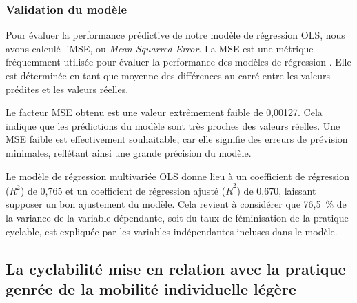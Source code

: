 \begin{refsegment}
\subsubsection*{Validation du modèle
    \label{chap4:methodologie-validation}
    }

Pour évaluer la performance prédictive de notre modèle de régression \acrshort{OLS}, nous avons calculé l'\acrfull{MSE}, ou \textsl{Mean Squarred Error}. La \acrshort{MSE} est une \gls{métrique} fréquemment utilisée pour évaluer la performance des modèles de régression \textcolor{blue}{\autocite{cochran_sampling_1963}}. Elle est déterminée en tant que moyenne des différences au carré entre les valeurs prédites et les valeurs réelles.%

Le facteur \acrshort{MSE} obtenu est une valeur extrêmement faible de 0,00127. Cela indique que les prédictions du modèle sont très proches des valeurs réelles. Une \acrshort{MSE} faible est effectivement souhaitable, car elle signifie des erreurs de prévision minimales, reflétant ainsi une grande précision du modèle.%

Le modèle de régression multivariée \acrshort{OLS} donne lieu à un coefficient de régression ($R^2$) de 0,765 et un coefficient de régression ajusté ($\bar{R}^2$) de 0,670, laissant supposer un bon ajustement du modèle. Cela revient à considérer que 76,5~\% de la variance de la variable dépendante, soit du taux de féminisation de la pratique cyclable, est expliquée par les variables indépendantes incluses dans le modèle.%

\subsection{La cyclabilité mise en relation avec la pratique genrée de la mobilité individuelle légère
    \label{section-chap4:cyclabilite-territoires-genre}
    }


\end{refsegment}

